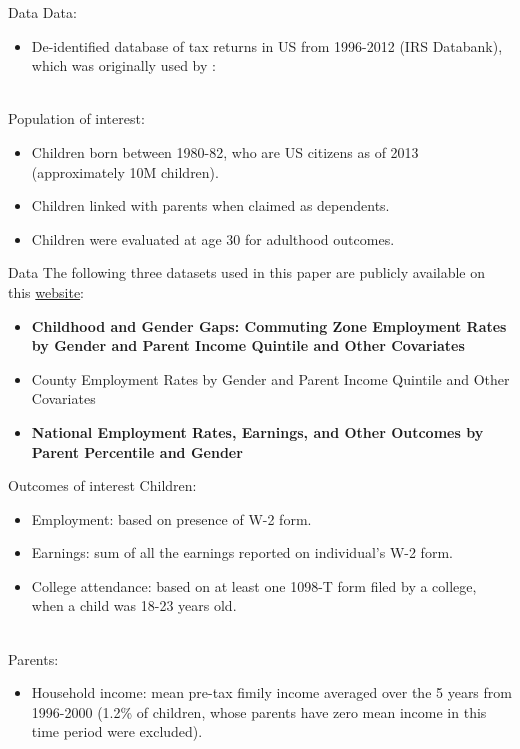 \documentclass{beamer}
\begin{document}
\begin{frame}{Data}
Data:
\begin{itemize}
	\item De-identified database of tax returns in US from 1996-2012 (IRS Databank), which was originally used by \cite{chetty2014land}:
\end{itemize}
\vline \\
Population of interest:
\begin{itemize}
	\item Children born between 1980-82, who are US citizens as of 2013 (approximately 10M children).
	\item Children linked with parents when claimed as dependents.
	\item Children were evaluated at age 30 for adulthood outcomes.
\end{itemize}
\end{frame}

\begin{frame}{Data}
The following three datasets used in this paper are publicly available on this \href{https://opportunityinsights.org/}{website}:
\begin{itemize}
	\item \textbf{Childhood and Gender Gaps: Commuting Zone Employment Rates by Gender and Parent Income Quintile and Other Covariates}
	\item County Employment Rates by Gender and Parent Income Quintile and Other Covariates
	\item \textbf{National Employment Rates, Earnings, and Other Outcomes by Parent Percentile and Gender}
\end{itemize}
\end{frame}

\begin{frame}{Outcomes of interest}
Children:
\begin{itemize}
	\item Employment: based on presence of W-2 form.
	\item Earnings: sum of all the earnings reported on individual's W-2 form.
	\item College attendance: based on at least one 1098-T form filed by a college, when a child was 18-23 years old.
\end{itemize}
\vline \\
Parents:
\begin{itemize}
	\item Household income: mean pre-tax fimily income averaged over the 5 years from 1996-2000 {\scriptsize(1.2\% of children, whose parents have zero mean income in this time period were excluded)}.
\end{itemize}
\end{frame}
\end{document}
